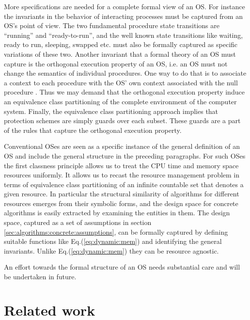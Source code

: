 \documentclass[draft]{article}
\begin{document}
More specifications  are needed for a  complete formal view  of an OS.
For instance  the invariants in the behavior  of interacting processes
must  be captured from  an OS's  point of  view.  The  two fundamental
procedure state transitions  are ``running'' and ``ready-to-run'', and
the well known state transitions like waiting, ready to run, sleeping,
swapped etc. must also be  formally captured as specific variations of
these  two.  Another  invariant that  a formal  theory of  an  OS must
capture is the orthogonal execution property of an OS, i.e. an OS must
not change the semantics of individual procedures.  One way to do that
is to associate  a context to each procedure  with the OS'
own context  associated with  the null procedure  .  Thus  we may
demand that  the orthogonal  execution property induce  an equivalence
class partitioning of the complete environment of the computer system.
Finally,  the  equivalence class  partitioning  approach implies  that
protection schemes  are simply guards over each  subset.  These guards
are  a  part  of  the  rules that  capture  the  orthogonal  execution
property.

Conventional  OSes are  seen as  a  specific instance  of the  general
definition of an OS and include the general structure in the preceding
paragraphs.  For such OSes the  first classness principle allows us to
treat the CPU time and memory space resources uniformly.  It allows us
to  recast the  resource management  problem in  terms  of equivalence
class partitioning of  an infinite countable set that  denotes a given
resource.  In  particular the structural similarity  of algorithms for
different resources emerges from  their symbolic forms, and the design
space  for concrete algorithms  is easily  extracted by  examining the
entities in them.  The design  space, captured as a set of assumptions
in section  \ref{sec:algorithms:concrete:assumptions}, can be formally
captured by defining suitable functions like Eq.(\ref{eq:dynamic:mem})
and      identifying     the      general      invariants.      Unlike
Eq.(\ref{eq:dynamic:mem}) they can be resource agnostic.

An effort towards the formal structure of an OS needs substantial care
and will be undertaken in future.

\section{Related work}
\label{sec:lit:review}
\end{document}
